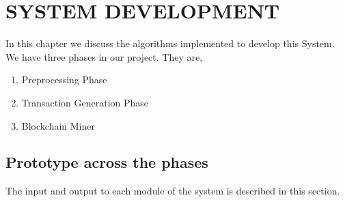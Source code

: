 
\chapter{SYSTEM DEVELOPMENT} %

In this chapter we discuss the algorithms implemented to develop
this System. We have three phases in our project. They are,
\begin{enumerate}
    \item Preprocessing Phase
\item Transaction Generation Phase
\item Blockchain Miner
\end{enumerate}
\section{Prototype across the phases}
The input and output to each module of the system is described in
this section.
